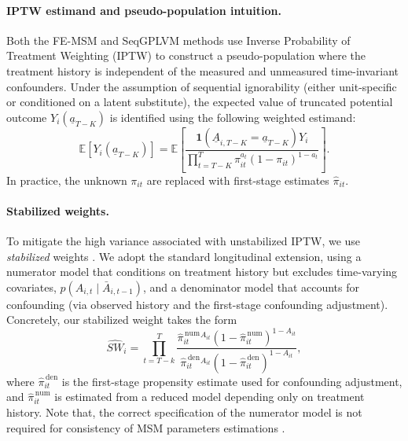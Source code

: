 \paragraph{IPTW estimand and pseudo-population intuition.}
Both the FE-MSM and SeqGPLVM methods use Inverse Probability of Treatment Weighting (IPTW) 
to construct a pseudo-population where the treatment history is independent of the measured and 
unmeasured time-invariant confounders. Under the assumption of sequential ignorability 
(either unit-specific or conditioned on a latent substitute), the expected value of truncated potential outcome 
$Y_i(\underline{a}_{T-K})$ is identified using the following weighted estimand:
$$\mathbb{E}[Y_i(\underline{a}_{T-K})] = \mathbb{E}\left[\frac{\mathbf{1}(\underline{A}_{i,T-K} = \underline{a}_{T-K})Y_i}{\prod_{t=T-K}^{T} \pi_{it}^{a_t}(1 - \pi_{it})^{1-a_t}}\right].$$
In practice, the unknown $\pi_{it}$ are replaced with first-stage estimates $\widehat{\pi}_{it}$. 


\paragraph{Stabilized weights.}
To mitigate the high variance associated with unstabilized IPTW, 
we use \emph{stabilized} weights \cite{robinsMarginalStructuralModels2000}.
We adopt the standard longitudinal extension, using a numerator model that 
conditions on treatment history but excludes time-varying covariates, $p(A_{i,t} \mid \bar{A}_{i,t-1})$, and a 
denominator model that accounts for confounding (via observed history and the 
first-stage confounding adjustment). Concretely, our stabilized weight takes the form
\[
\widehat{SW}_i
=
\prod_{t=T-k}^{T}
\frac{
\widehat{\pi}^{\,\text{num}}_{it}{}^{A_{it}}\left(1-\widehat{\pi}^{\,\text{num}}_{it}\right)^{1-A_{it}}
}{
\widehat{\pi}^{\,\text{den}}_{it}{}^{A_{it}}\left(1-\widehat{\pi}^{\,\text{den}}_{it}\right)^{1-A_{it}}
},
\]
where $\widehat{\pi}^{\,\text{den}}_{it}$ is the first-stage propensity estimate used for confounding adjustment, and
$\widehat{\pi}^{\,\text{num}}_{it}$ is estimated from a reduced model depending only on treatment history. Note that, 
the correct specification of the numerator model is not required for consistency of MSM parameters estimations \cite{robinsMarginalStructuralModels2000}. 

